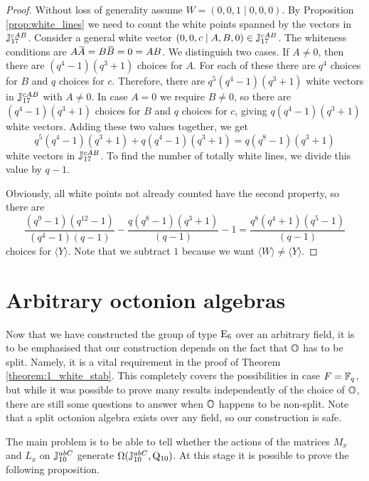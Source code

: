 \begin{proof}
	Without loss of generality assume $W = (0,0,1\mid 0,0,0)$. By Proposition 
	\ref{prop:white_lines} we need to count the white points spanned by the vectors in
	$\mathbb{J}_{17}^{cAB}$. Consider a general white vector $(0,0,c\mid A,B,0) \in \mathbb{J}_{17}^{cAB}$. 
	The whiteness conditions are $A\ovA = B\ovB = 0 = AB$. We distinguish two cases.
	If $A \neq 0$, then there are $(q^4-1)(q^3+1)$ choices for $A$. For each of these
	there are $q^4$ choices for $B$ and $q$ choices for $c$. Therefore, there are
	$q^5(q^4-1)(q^3+1)$ white vectors in $\mathbb{J}_{17}^{cAB}$ with $A \neq 0$.
	In case $A = 0$ we require $B \neq 0$, so there are $(q^4-1)(q^3+1)$ choices for
	$B$ and $q$ choices for $c$, giving $q(q^4-1)(q^3+1)$ white vectors. 
	Adding these two values together, we get
	\begin{equation*}
		q^5(q^4-1)(q^3+1) + q(q^4-1)(q^3+1) = q(q^8-1)(q^3+1)
	\end{equation*}	
	white vectors in $\mathbb{J}_{17}^{cAB}$. To find the number of totally white lines, we divide this
	value by $q-1$. 
	
	Obviously, all white points not already counted have the second property, so there are
	\begin{equation*}
		\frac{(q^9-1)(q^{12}-1)}{(q^4-1)(q-1)} - 
			\frac{q(q^8-1)(q^3+1)}{(q-1)} - 1 = \frac{q^8(q^4+1)(q^5-1)}{(q-1)}
	\end{equation*}
	choices for $\langle Y \rangle$. Note that we subtract $1$ because we want 
	$\langle W \rangle \neq \langle Y \rangle$.
\end{proof}


\section{Arbitrary octonion algebras} 

Now that we have constructed the group of type $\mathord{\mathrm{E}}_6$ over 
an arbitrary field, it is to be emphasised that our construction depends on the fact that
$\mathbb{O}$ has to be split. Namely, it is a vital requirement in the proof of Theorem 
\ref{theorem:1_white_stab}. This completely covers the possibilities in case $F = \mathbb{F}_q$, but 
while it was possible to prove many results independently of the choice of $\mathbb{O}$, there are still
some questions to answer when $\mathbb{O}$ happens to be non-split. Note that a split octonion algebra
exists over any field, so our construction is safe. 

The main problem is to be able to tell whether the actions of the matrices $M_x$ and $L_x$ on
$\mathbb{J}_{10}^{abC}$ generate $\Omega( \mathbb{J}_{10}^{abC}, \mathord{\mathrm{Q}}_{10} )$. At this stage it is possible to 
prove the following proposition.

